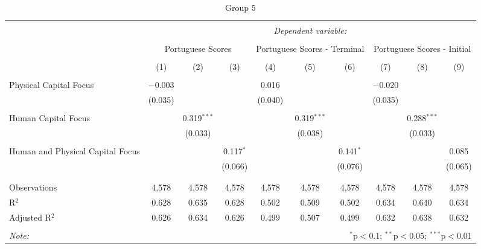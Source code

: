 
\begin{table}[!htbp] \centering 
  \caption{Group 5} 
  \label{} 
\begin{tabular}{@{\extracolsep{5pt}}lccccccccc} 
\\[-1.8ex]\hline 
\hline \\[-1.8ex] 
 & \multicolumn{9}{c}{\textit{Dependent variable:}} \\ 
\cline{2-10} 
\\[-1.8ex] & \multicolumn{3}{c}{Portuguese Scores} & \multicolumn{3}{c}{Portuguese Scores - Terminal} & \multicolumn{3}{c}{Portuguese Scores - Initial} \\ 
\\[-1.8ex] & (1) & (2) & (3) & (4) & (5) & (6) & (7) & (8) & (9)\\ 
\hline \\[-1.8ex] 
 Physical Capital Focus & $-$0.003 &  &  & 0.016 &  &  & $-$0.020 &  &  \\ 
  & (0.035) &  &  & (0.040) &  &  & (0.035) &  &  \\ 
  & & & & & & & & & \\ 
 Human Capital Focus &  & 0.319$^{***}$ &  &  & 0.319$^{***}$ &  &  & 0.288$^{***}$ &  \\ 
  &  & (0.033) &  &  & (0.038) &  &  & (0.033) &  \\ 
  & & & & & & & & & \\ 
 Human and Physical Capital Focus &  &  & 0.117$^{*}$ &  &  & 0.141$^{*}$ &  &  & 0.085 \\ 
  &  &  & (0.066) &  &  & (0.076) &  &  & (0.065) \\ 
  & & & & & & & & & \\ 
\hline \\[-1.8ex] 
Observations & 4,578 & 4,578 & 4,578 & 4,578 & 4,578 & 4,578 & 4,578 & 4,578 & 4,578 \\ 
R$^{2}$ & 0.628 & 0.635 & 0.628 & 0.502 & 0.509 & 0.502 & 0.634 & 0.640 & 0.634 \\ 
Adjusted R$^{2}$ & 0.626 & 0.634 & 0.626 & 0.499 & 0.507 & 0.499 & 0.632 & 0.638 & 0.632 \\ 
\hline 
\hline \\[-1.8ex] 
\textit{Note:}  & \multicolumn{9}{r}{$^{*}$p$<$0.1; $^{**}$p$<$0.05; $^{***}$p$<$0.01} \\ 
\end{tabular} 
\end{table} 
